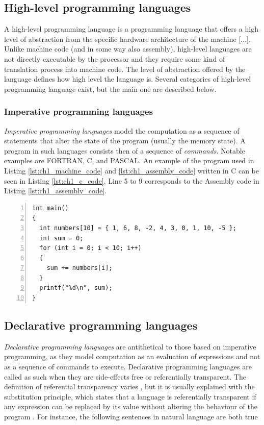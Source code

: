 \subsection{High-level programming languages}
\label{subsec:ch1_hl_languages}
A high-level programming language is a programming language that offers a high level of abstraction from the specific hardware architecture of the machine [...]. Unlike machine code (and in some way also assembly), high-level languages are not directly executable by the processor and they require some kind of translation process into machine code. The level of abstraction offered by the language defines how high level the language is. Several categories of high-level programming language exist, but the main one are described below.

\subsubsection*{Imperative programming languages}
\textit{Imperative programming languages} model the computation as a sequence of statements that alter the state of the program (usually the memory state). A program in such languages consists then of a sequence of \textit{commands}. Notable examples are FORTRAN, C, and PASCAL. An example of the program used in Listing \ref{lst:ch1_machine_code} and \ref{lst:ch1_assembly_code} written in C can be seen in Listing \ref{lst:ch1_c_code}. Line 5 to 9 corresponds to the Assembly code in Listing \ref{lst:ch1_assembly_code}.

\begin{lstlisting}[numbers = left, caption = C code to compute the sum of a sequence of numbers, label = lst:ch1_c_code]
int main()
{
  int numbers[10] = { 1, 6, 8, -2, 4, 3, 0, 1, 10, -5 };
  int sum = 0;
  for (int i = 0; i < 10; i++)
  {
    sum += numbers[i];
  }
  printf("%d\n", sum);
}
\end{lstlisting}

\subsection*{Declarative programming languages}
\textit{Declarative programming languages} are antithetical to those based on imperative programming, as they model computation as an evaluation of expressions and not as a sequence of commands to execute. Declarative programming languages are called as such when they are side-effects free or referentially transparent. The definition of referential transparency varies \cite{quine2013word}, but it is usually explained with the substitution principle, which states that a language is referentially transparent if any expression can be replaced by its value without altering the behaviour of the program \cite{mitchell2003concepts}. For instance, the following sentences in natural language are both true

